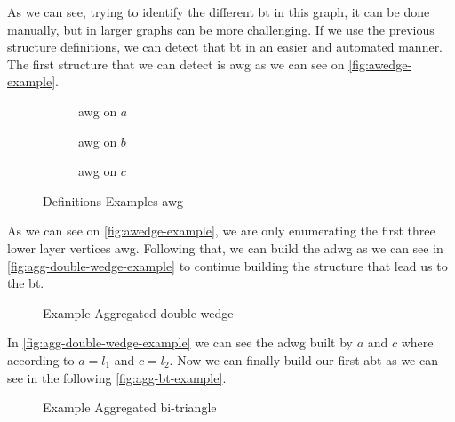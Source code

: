 As we can see, trying to identify the different \acrshort{bt} in this graph, it can be done manually, but in larger graphs can be more challenging.
If we use the previous structure definitions, we can detect that \acrshort {bt} in an easier and automated manner.
The first structure that we can detect is \acrshort{awg} as we can see on \autoref{fig:awedge-example}.

\begin{figure}[htp!]
\begin{subfigure}[b]{0.3\textwidth}
\centering
{}
\caption{\acrshort{awg} on $a$}
\label{fig:awedge-example-a}
\end{subfigure}
\begin{subfigure}[b]{0.3\textwidth}
\centering
{}
\caption{\acrshort{awg} on $b$}
\label{fig:awedge-example-b}
\end{subfigure}
\begin{subfigure}[b]{0.3\textwidth}
\centering
{}
\caption{\acrshort{awg} on $c$}
\label{fig:awedge-example-c}
\end{subfigure}
\caption[Definitions Examples \acrshort{awg}]{Definitions Examples \acrshort{awg}}
\label{fig:awedge-example}
\end{figure}

As we can see on \autoref{fig:awedge-example}, we are only enumerating the first three lower layer vertices \acrshort{awg}.
Following that, we can build the \acrlong{adwg} as we can see in \autoref{fig:agg-double-wedge-example} to continue building the structure that lead us to the \acrshort{bt}.

\begin{figure}[htp!]
\centering
{}
\caption[Example Aggregated double-wedge]{Example Aggregated double-wedge}
\label{fig:agg-double-wedge-example}
\end{figure}

In \autoref{fig:agg-double-wedge-example} we can see the \acrshort{adwg} built by $a$ and $c$ where according to  $a = l_1$ and $c = l_2$.
Now we can finally build our first \acrlong{abt} as we can see in the following \autoref{fig:agg-bt-example}.

\begin{figure}[htp!]
\centering      
{}
\caption[Example Aggregated bi-triangle]{Example Aggregated bi-triangle}
\label{fig:agg-bt-example}
\end{figure}


